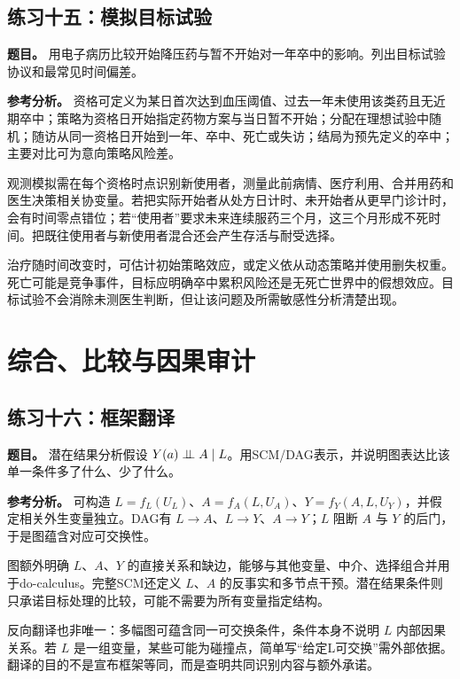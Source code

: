 \subsection*{练习十五：模拟目标试验}

\textbf{题目。} 用电子病历比较开始降压药与暂不开始对一年卒中的影响。列出目标试验协议和最常见时间偏差。

\textbf{参考分析。} 资格可定义为某日首次达到血压阈值、过去一年未使用该类药且无近期卒中；策略为资格日开始指定药物方案与当日暂不开始；分配在理想试验中随机；随访从同一资格日开始到一年、卒中、死亡或失访；结局为预先定义的卒中；主要对比可为意向策略风险差。

观测模拟需在每个资格时点识别新使用者，测量此前病情、医疗利用、合并用药和医生决策相关协变量。若把实际开始者从处方日计时、未开始者从更早门诊计时，会有时间零点错位；若“使用者”要求未来连续服药三个月，这三个月形成不死时间。把既往使用者与新使用者混合还会产生存活与耐受选择。

治疗随时间改变时，可估计初始策略效应，或定义依从动态策略并使用删失权重。死亡可能是竞争事件，目标应明确卒中累积风险还是无死亡世界中的假想效应。目标试验不会消除未测医生判断，但让该问题及所需敏感性分析清楚出现。

\section{综合、比较与因果审计}

\subsection*{练习十六：框架翻译}

\textbf{题目。} 潜在结果分析假设 $Y(a)\mathrel{\perp\!\!\!\perp} A\mid L$。用SCM/DAG表示，并说明图表达比该单一条件多了什么、少了什么。

\textbf{参考分析。} 可构造 $L=f_L(U_L)$、$A=f_A(L,U_A)$、$Y=f_Y(A,L,U_Y)$，并假定相关外生变量独立。DAG有 $L\rightarrow A$、$L\rightarrow Y$、$A\rightarrow Y$；$L$ 阻断 $A$ 与 $Y$ 的后门，于是图蕴含对应可交换性。

图额外明确 $L$、$A$、$Y$ 的直接关系和缺边，能够与其他变量、中介、选择组合并用于do-calculus。完整SCM还定义 $L$、$A$ 的反事实和多节点干预。潜在结果条件则只承诺目标处理的比较，可能不需要为所有变量指定结构。

反向翻译也非唯一：多幅图可蕴含同一可交换条件，条件本身不说明 $L$ 内部因果关系。若 $L$ 是一组变量，某些可能为碰撞点，简单写“给定L可交换”需外部依据。翻译的目的不是宣布框架等同，而是查明共同识别内容与额外承诺。

